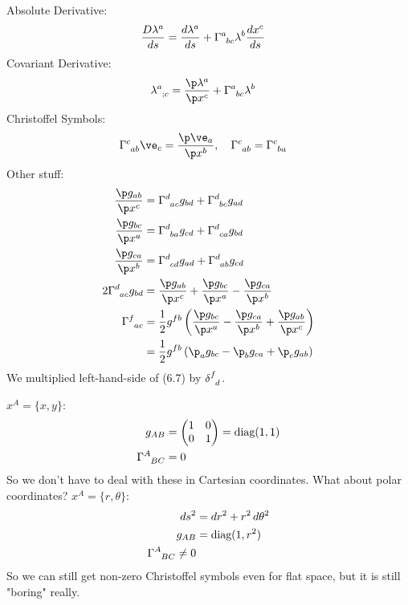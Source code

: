 \documentclass[a4paper, 11pt, normalem]{report}
\begin{document}
\chapter{}
Absolute Derivative:
\begin{align}
    \frac{D\lambda^a}{ds} &= \frac{d\lambda^a}{ds} + \tensor{\Gamma}{^a_{bc}}\lambda^b\frac{dx^c}{ds}
\end{align}
Covariant Derivative:
\begin{align}
    \tensor{\lambda}{^a_{;c}} &= \frac{\p\lambda^a}{\p x^c}+\tensor{\Gamma}{^a_{bc}}\lambda^b
\end{align}
Christoffel Symbols:
\begin{align}
    \tensor{\Gamma}{^c_{ab}}\ve_c &= \frac{\p\ve_a}{\p x^b},\quad \tensor{\Gamma}{^c_{ab}} = \tensor{\Gamma}{^c_{ba}}
\end{align}
Other stuff:
\begin{align}
    \frac{\p g_{ab}}{\p x^c} &= \tensor{\Gamma}{^d_{ac}}g_{bd} + \tensor{\Gamma}{^d_{bc}}g_{ad}\\
    \frac{\p g_{bc}}{\p x^a} &= \tensor{\Gamma}{^d_{ba}}g_{cd} + \tensor{\Gamma}{^d_{ca}}g_{bd}\\
    \frac{\p g_{ca}}{\p x^b} &= \tensor{\Gamma}{^d_{cd}}g_{ad} + \tensor{\Gamma}{^d_{ab}}g_{cd}\\
    2\tensor{\Gamma}{^d_{ac}}g_{bd} &= \frac{\p g_{ab}}{\p x^c} + \frac{\p g_{bc}}{\p x^a} - \frac{\p g_{ca}}{\p x^b} \\
    \tensor{\Gamma}{^f_{ac}} &= \frac12 g^{fb}\left(\frac{\p g_{bc}}{\p x^a} - \frac{\p g_{ca}}{\p x^b} + \frac{\p g_{ab}}{\p x^c}\right) \\
                             &= \frac12 g^{fb}\left(\p_a g_{bc} - \p_b g_{ca} + \p_c g_{ab}\right)
\end{align}
We multiplied left-hand-side of (6.7) by $\tensor{\delta}{^f_d}$.

\begin{example}
    $x^A = \{x,y\}$:
    \begin{align}
        g_{AB} &= \begin{pmatrix} 1 & 0 \\ 0 & 1 \end{pmatrix} = \text{diag}(1,1) \\
        \tensor{\Gamma}{^A_{BC}} &= 0
    \end{align}
    So we don't have to deal with these in Cartesian coordinates. What about polar coordinates? $x^A = \{r,\theta\}$:
    \begin{align}
        ds^2 &= dr^2 + r^2\,d\theta^2 \\
        g_{AB} &= \text{diag}(1,r^2) \\
        \tensor{\Gamma}{^A_{BC}} \neq 0
    \end{align}
    So we can still get non-zero Christoffel symbols even for flat space, but it is still "boring" really.
\end{example}
\end{document}
